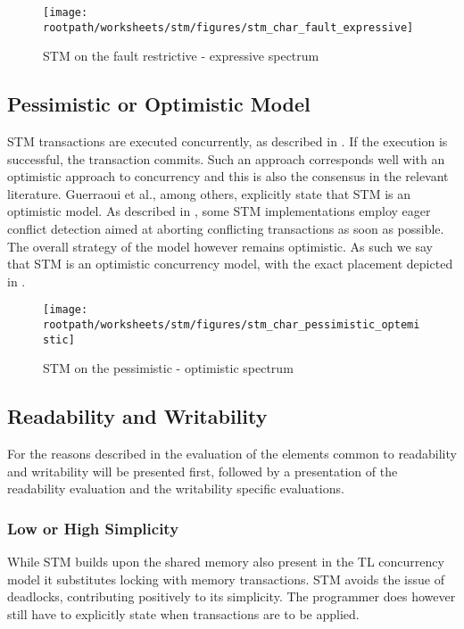 \begin{figure}[htbp]
\centering
 \texttt{[image: \\rootpath/worksheets/stm/figures/stm\_char\_fault\_expressive]} 
 \caption{\ac{STM} on the fault restrictive - expressive spectrum}
\label{fig:stm_char_fault_expressive}
\end{figure}

\subsection{Pessimistic or Optimistic Model}
\ac{STM} transactions are executed concurrently, as described in . If the execution is successful, the transaction commits. Such an approach corresponds well with an optimistic approach to concurrency and this is also the consensus in the relevant literature. Guerraoui et al., among others, explicitly state that \ac{STM} is an optimistic model\cite[p. 1]{guerraoui2005toward}. As described in , some \ac{STM} implementations employ eager conflict detection aimed at aborting conflicting transactions as soon as possible. The overall strategy of the model however remains optimistic. As such we say that \ac{STM} is an optimistic concurrency model, with the exact placement depicted in .

\begin{figure}[htbp]
\centering
 \texttt{[image: \\rootpath/worksheets/stm/figures/stm\_char\_pessimistic\_optemistic]} 
 \caption{\ac{STM} on the pessimistic - optimistic spectrum}
\label{fig:stm_char_pes_opti}
\end{figure}

\subsection{Readability and Writability}
For the reasons described in  the evaluation of the elements common to readability and writability will be presented first, followed by a presentation of the readability evaluation and the writability specific evaluations.

\subsubsection{Low or High Simplicity}
\label{subsec:stm_char_simplicity}
While \ac{STM} builds upon the shared memory also present in the \ac{TL} concurrency model it substitutes locking with memory transactions. \ac{STM} avoids the issue of deadlocks, contributing positively to its simplicity. The programmer does however still have to explicitly state when transactions are to be applied.

